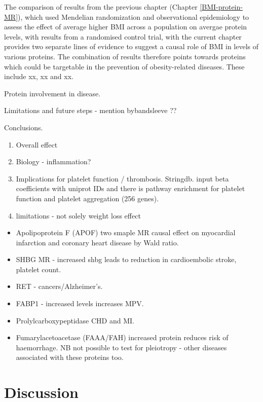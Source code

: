 \documentclass[11pt,twoside]{bristolthesis}
\providecommand{\tightlist}{%
  \setlength{\itemsep}{0pt}\setlength{\parskip}{0pt}}
\begin{document}
The comparison of results from the previous chapter (Chapter \ref{BMI-protein-MR}), which used Mendelian randomization and observational epidemiology to assess the effect of average higher BMI across a population on avergae protein levels, with results from a randomised control trial, with the current chapter provides two separate lines of evidence to suggest a causal role of BMI in levels of various proteins. The combination of results therefore points towards proteins which could be targetable in the prevention of obesity-related diseases. These include xx, xx and xx.

Protein involvement in disease.

Limitations and future steps - mention bybandsleeve ??

Conclusions.
\begin{enumerate}
\def\labelenumi{\arabic{enumi}.}
\tightlist
\item
  Overall effect
\item
  Biology - inflammation?
\item
  Implications for platelet function / thrombosis. Stringdb. input beta coefficients with uniprot IDs and there is pathway enrichment for platelet function and platelet aggregation (256 genes).
\item
  limitations - not solely weight loss effect
\end{enumerate}
\begin{itemize}
\tightlist
\item
  Apolipoprotein F (APOF) two smaple MR causal effect on myocardial infarction and coronary heart disease by Wald ratio.
\item
  SHBG MR - increased shbg leads to reduction in cardioembolic stroke, platelet count.
\item
  RET - cancers/Alzheimer's.
\item
  FABP1 - increased levels increases MPV.
\item
  Prolylcarboxypeptidase CHD and MI.
\item
  Fumarylacetoacetase (FAAA/FAH) increased protein reduces risk of haemorrhage.
  NB not possible to test for pleiotropy - other diseases associated with these proteins too.
\end{itemize}
\hypertarget{discussion-5}{%
\chapter*{Discussion}\label{discussion-5}}
\end{document}
